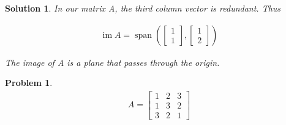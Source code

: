 \documentclass{article}
\newtheorem{problem}{Problem}
\newtheorem*{solution}{Solution}
\DeclareMathOperator{\Span}{span}
\DeclareMathOperator{\im}{im}
\begin{document}
\begin{solution}
In our matrix A, the third column vector is redundant. Thus 

\begin{align*}
\im A = \Span \left( \begin{bmatrix} 1 \\ 1 \end{bmatrix}, \begin{bmatrix} 1 \\ 2  \end{bmatrix} \right)
\end{align*} 

The image of A is a plane that passes through the origin.

\end{solution}

\begin{problem}
\begin{align*}
A = \begin{bmatrix}1 & 2 & 3 \\ 1 & 3 & 2 \\ 3 & 2 & 1 \end{bmatrix}
\end{align*}
\end{problem}
\end{document}
